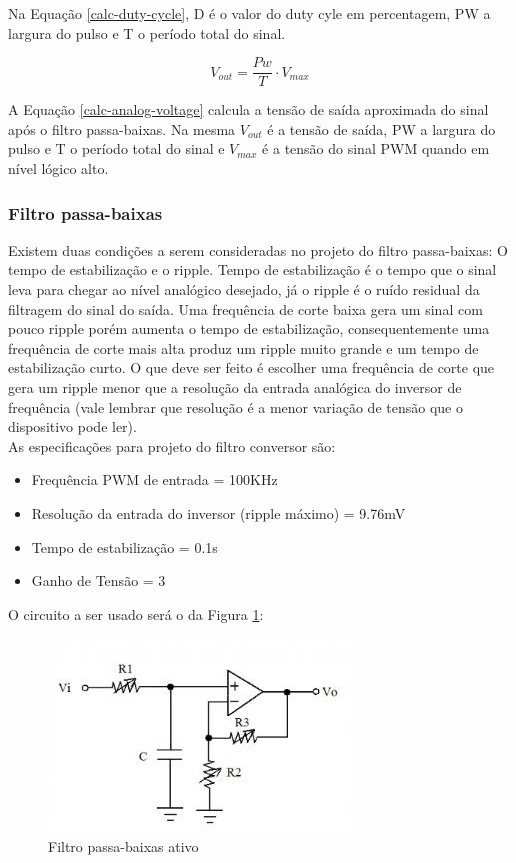 Na Equação \ref{calc-duty-cycle}, D é o valor do duty cyle em percentagem, PW a largura do pulso e T o período total do sinal.

\begin{equation}\label{calc-analog-voltage}
	V_{out}=\frac{ Pw }{ T } \cdot V_{max}
\end{equation}

A Equação \ref{calc-analog-voltage} calcula a tensão de saída aproximada do sinal após o filtro passa-baixas. Na mesma $V_{out}$ é a tensão de saída, PW a largura do pulso e T o período total do sinal e $V_{max}$ é a tensão do sinal PWM quando em nível lógico alto.

\subsubsection{Filtro passa-baixas}

Existem duas condições a serem consideradas no projeto do filtro passa-baixas: O tempo de estabilização e o ripple. Tempo de estabilização é o tempo que o sinal leva para chegar ao nível analógico desejado, já o ripple é o ruído residual da filtragem do sinal do saída. Uma frequência de corte baixa gera um sinal com pouco ripple porém aumenta o tempo de estabilização, consequentemente uma frequência de corte mais alta produz um ripple muito grande e um tempo de estabilização curto. O que deve ser feito é escolher uma frequência de corte que gera um ripple menor que a resolução da entrada analógica do inversor de frequência (vale lembrar que resolução é a menor variação de tensão que o dispositivo pode ler). \\

As especificações para projeto do filtro conversor são:

\begin{itemize}
	\item Frequência PWM de entrada = 100KHz
	\item Resolução da entrada do inversor (ripple máximo) = 9.76mV
	\item Tempo de estabilização = 0.1s
	\item Ganho de Tensão = 3
\end{itemize}

O circuito a ser usado será o da Figura \ref{active-lpf}:

\begin{figure}[htbp]
	\centering
	\includegraphics[scale=0.3]{figuras/lpf.jpg}
	\caption{Filtro passa-baixas ativo}
	\label{active-lpf}
\end{figure}

